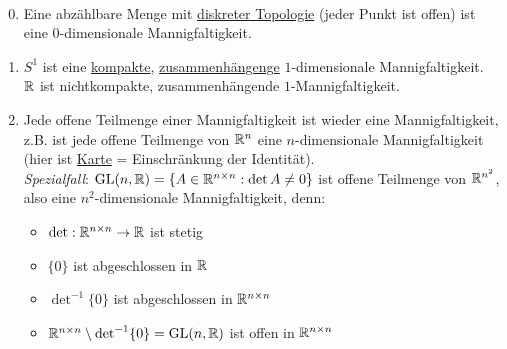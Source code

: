 \begin{example}
  \
  \begin{enumerate}
    \setcounter{enumi}{-1}

    \item Eine abzählbare Menge mit \hyperref[bsp:diskreteTopologie]{diskreter Topologie} (jeder Punkt ist offen) ist eine $ 0 $-dimensionale Mannigfaltigkeit.

    \item $ S^1 $ ist eine \hyperref[def:kompakt]{kompakte}, \hyperref[def:zusammenhaengend]{zusammenhängenge} $ 1 $-dimensionale Mannigfaltigkeit. \\
      $ \mathbb{R} $ ist nichtkompakte, zusammenhängende $ 1 $-Mannigfaltigkeit.

    \item Jede offene Teilmenge einer Mannigfaltigkeit ist wieder eine Mannigfaltigkeit, z.B. ist jede offene Teilmenge von $ \mathbb{R}^n $ eine $ n $-dimensionale Mannigfaltigkeit (hier ist \hyperref[def:karte]{Karte} = Einschränkung der Identität). \\
    \emph{Spezialfall}: $ \text{GL}(n,\mathbb{R}) = \{ A \in \mathbb{R}^{n \times n} : \det A \neq 0 \} $ ist offene Teilmenge von $ \mathbb{R}^{n^2} $, also eine $ n^2 $-dimensionale Mannigfaltigkeit, denn:
    \begin{itemize}
      \item $ \det : \mathbb{R}^{n \times n} \to \mathbb{R} $ ist stetig
      \item $ \{ 0 \} $ ist abgeschlossen in $ \mathbb{R} $ 
      \item $ \det^{-1} \{ 0 \} $ ist abgeschlossen in $ \mathbb{R}^{n \times n} $
      \item $ \mathbb{R}^{n \times n} \setminus \det^{-1} \{ 0 \} = \text{GL}(n,\mathbb{R} ) $ ist offen in $ \mathbb{R}^{n \times n} $
    \end{itemize}


\end{enumerate}
\end{example}
